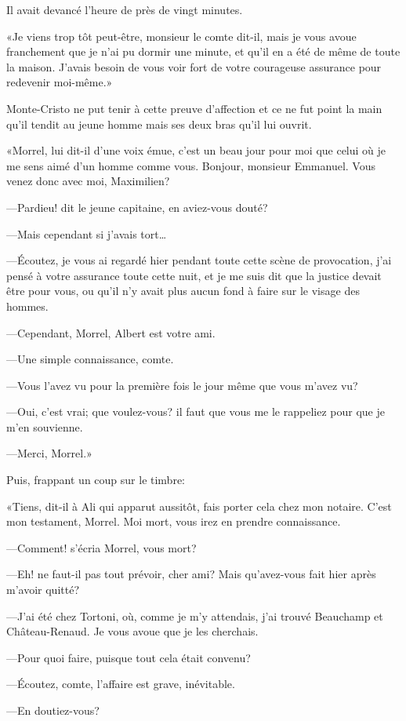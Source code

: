Il avait devancé l'heure de près de vingt minutes. 

«Je viens trop tôt peut-être, monsieur le comte dit-il, mais je vous avoue franchement que je n'ai pu dormir une minute, et qu'il en a été de même de toute la maison. J'avais besoin de vous voir fort de votre courageuse assurance pour redevenir moi-même.» 

Monte-Cristo ne put tenir à cette preuve d'affection et ce ne fut point la main qu'il tendit au jeune homme mais ses deux bras qu'il lui ouvrit. 

«Morrel, lui dit-il d'une voix émue, c'est un beau jour pour moi que celui où je me sens aimé d'un homme comme vous. Bonjour, monsieur Emmanuel. Vous venez donc avec moi, Maximilien? 

—Pardieu! dit le jeune capitaine, en aviez-vous douté? 

—Mais cependant si j'avais tort\dots 

—Écoutez, je vous ai regardé hier pendant toute cette scène de provocation, j'ai pensé à votre assurance toute cette nuit, et je me suis dit que la justice devait être pour vous, ou qu'il n'y avait plus aucun fond à faire sur le visage des hommes. 

—Cependant, Morrel, Albert est votre ami. 

—Une simple connaissance, comte. 

—Vous l'avez vu pour la première fois le jour même que vous m'avez vu? 

—Oui, c'est vrai; que voulez-vous? il faut que vous me le rappeliez pour que je m'en souvienne. 

—Merci, Morrel.» 

Puis, frappant un coup sur le timbre: 

«Tiens, dit-il à Ali qui apparut aussitôt, fais porter cela chez mon notaire. C'est mon testament, Morrel. Moi mort, vous irez en prendre connaissance. 

—Comment! s'écria Morrel, vous mort? 

—Eh! ne faut-il pas tout prévoir, cher ami? Mais qu'avez-vous fait hier après m'avoir quitté? 

—J'ai été chez Tortoni, où, comme je m'y attendais, j'ai trouvé Beauchamp et Château-Renaud. Je vous avoue que je les cherchais. 

—Pour quoi faire, puisque tout cela était convenu? 

—Écoutez, comte, l'affaire est grave, inévitable. 

—En doutiez-vous? 

